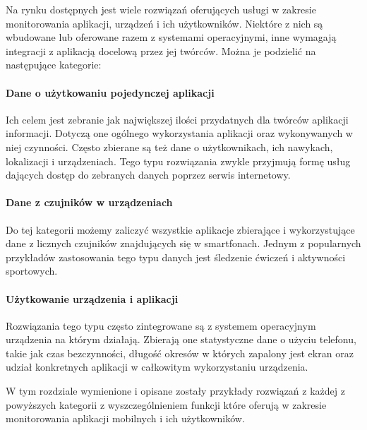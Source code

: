 Na rynku dostępnych jest wiele rozwiązań oferujących usługi w zakresie monitorowania aplikacji, urządzeń i ich użytkowników. Niektóre z nich są wbudowane lub oferowane razem z systemami operacyjnymi, inne wymagają integracji z aplikacją docelową przez jej twórców. Można je podzielić na następujące kategorie:

\paragraph{Dane o użytkowaniu pojedynczej aplikacji} 
Ich celem jest zebranie jak największej ilości przydatnych dla twórców aplikacji informacji. Dotyczą one ogólnego wykorzystania aplikacji oraz wykonywanych w niej czynności. Często zbierane są też dane o użytkownikach, ich nawykach, lokalizacji i urządzeniach. Tego typu rozwiązania zwykle przyjmują formę usług dających dostęp do zebranych danych poprzez serwis internetowy. 

\paragraph{Dane z czujników w urządzeniach} 
Do tej kategorii możemy zaliczyć wszystkie aplikacje zbierające i wykorzystujące dane z licznych czujników znajdujących się w smartfonach. Jednym z popularnych przykładów zastosowania tego typu danych jest śledzenie ćwiczeń i aktywności sportowych.

\paragraph{Użytkowanie urządzenia i aplikacji} 
Rozwiązania tego typu często zintegrowane są z systemem operacyjnym urządzenia na którym działają. Zbierają one statystyczne dane o użyciu telefonu, takie jak czas bezczynności, długość okresów w których zapalony jest ekran oraz udział konkretnych aplikacji w całkowitym wykorzystaniu urządzenia.
\bigskip

W tym rozdziale wymienione i opisane zostały przykłady rozwiązań z każdej z powyższych kategorii z wyszczególnieniem funkcji które oferują w zakresie monitorowania aplikacji mobilnych i ich użytkowników.

